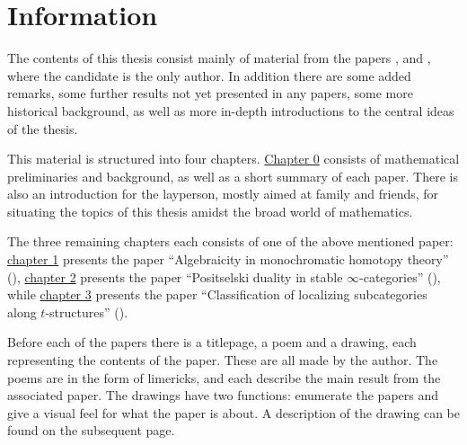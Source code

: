 
\section*{Information}

The contents of this thesis consist mainly of material from the papers \cite{aambo_2024_algebraicity}, \cite{aambo_2024_positselski} and \cite{aambo_2024_localizing}, where the candidate is the only author. In addition there are some added remarks, some further results not yet presented in any papers, some more historical background, as well as more in-depth introductions to the central ideas of the thesis. 

This material is structured into four chapters. \hyperref[ch0]{Chapter 0} consists of mathematical preliminaries and background, as well as a short summary of each paper. There is also an introduction for the layperson, mostly aimed at family and friends, for situating the topics of this thesis amidst the broad world of mathematics. 

The three remaining chapters each consists of one of the above mentioned paper: \hyperref[ch1]{chapter 1} presents the paper ``Algebraicity in monochromatic homotopy theory'' (\cite{aambo_2024_algebraicity}), \hyperref[ch2]{chapter 2} presents the paper ``Positselski duality in stable $\infty$-categories'' (\cite{aambo_2024_positselski}), while \hyperref[ch3]{chapter 3} presents the paper ``Classification of localizing subcategories along $t$-structures'' (\cite{aambo_2024_localizing}). 

Before each of the papers there is a titlepage, a poem and a drawing, each representing the contents of the paper. These are all made by the author. The poems are in the form of limericks, and each describe the main result from the associated paper. The drawings have two functions: enumerate the papers and give a visual feel for what the paper is about. A description of the drawing can be found on the subsequent page. 

